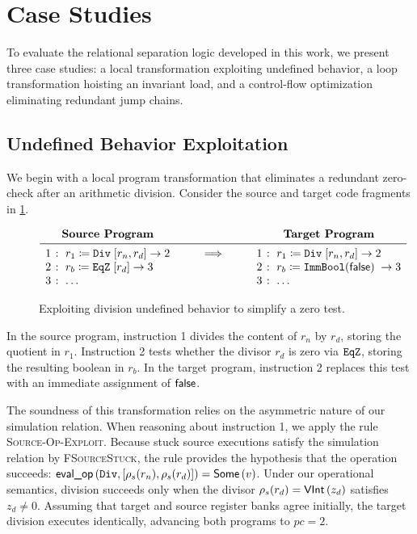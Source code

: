\documentclass[report.tex]{subfiles}
\begin{document}
\section{Case Studies}
\label{sec:case-studies}

To evaluate the relational separation logic developed in this work,
we present three case studies:
a local transformation exploiting undefined behavior,
a loop transformation hoisting an invariant load,
and a control-flow optimization eliminating redundant jump chains.

\subsection{Undefined Behavior Exploitation}
\label{sec:case-study-ub}

We begin with a local program transformation that eliminates a redundant
zero-check after an arithmetic division.
Consider the source and target code fragments in \cref{fig:case-study-ub}.

\begin{figure}[htp]
  \centering
  \begin{equation*}
    \begin{array}{r@{\;\colon\;}l c r@{\;\colon\;}l}
      \multicolumn{2}{c}{\textbf{Source Program}}
      & \hspace{2cm}
      & \multicolumn{2}{c}{\textbf{Target Program}}
      \\
      \midrule
      1 & \Iop{r_1}{\Odiv}{[r_n, r_d]}{2}
      & \quad\implies\quad
      & 1 & \Iop{r_1}{\Odiv}{[r_n, r_d]}{2}
      \\
      2 & \Iop{r_b}{\Oeqz}{[r_d]}{3}
      &
      & 2 & \Iop{r_b}{\Oimmbool{\false}}{}{3}
      \\
      3 & \dots
      &
      & 3 & \dots
    \end{array}
  \end{equation*}
  \caption{Exploiting division undefined behavior to simplify a zero test.}
  \label{fig:case-study-ub}
\end{figure}

In the source program,
instruction 1 divides the content of $r_n$ by $r_d$,
storing the quotient in $r_1$.
Instruction 2 tests whether the divisor $r_d$ is zero via $\mathtt{EqZ}$,
storing the resulting boolean in $r_b$.
In the target program,
instruction 2 replaces this test with an immediate assignment of $\textsf{false}$.

The soundness of this transformation relies on the asymmetric nature of our
simulation relation.
When reasoning about instruction 1,
we apply the rule \textsc{Source-Op-Exploit}.
Because stuck source executions satisfy the simulation relation by
\textsc{FSourceStuck},
the rule provides the hypothesis that the operation succeeds:
$\textsf{eval\_op}\left(\mathtt{Div}, [\rho_s(r_n), \rho_s(r_d)]\right) = \textsf{Some}\left(v\right)$.
Under our operational semantics,
division succeeds only when the divisor $\rho_s(r_d) = \textsf{VInt}\left(z_d\right)$
satisfies $z_d \neq 0$.
Assuming that target and source register banks agree initially,
the target division executes identically,
advancing both programs to $pc = 2$.
\end{document}
